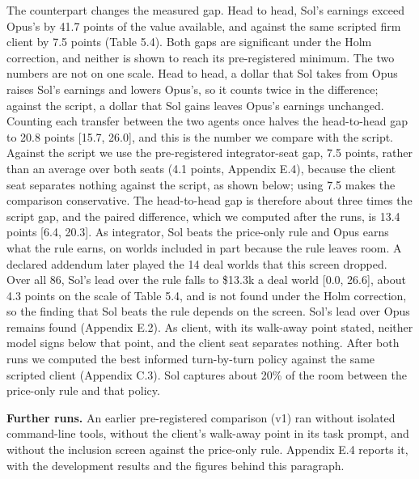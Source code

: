 The counterpart changes the measured gap. Head to head, Sol's earnings exceed Opus's by 41.7 points of the value
available, and against the same scripted firm client by 7.5 points (Table 5.4). Both gaps are significant under the
Holm correction, and neither is shown to reach its pre-registered minimum. The two numbers are not on one scale. Head
to head, a dollar that Sol takes from Opus raises Sol's earnings and lowers Opus's, so it counts twice in the
difference; against the script, a dollar that Sol gains leaves Opus's earnings unchanged. Counting each transfer between the two agents once halves the head-to-head gap to 20.8 points {[}15.7, 26.0{]}, and
this is the number we compare with the script. Against the script we use the pre-registered integrator-seat gap,
7.5 points, rather than an average over both seats (4.1 points, Appendix E.4), because the client seat separates
nothing against the script, as shown below; using 7.5 makes the comparison conservative. The head-to-head gap is
therefore about three times the script gap, and the paired difference, which we computed after the runs, is 13.4
points {[}6.4, 20.3{]}. As
integrator, Sol beats the price-only rule and Opus earns what the rule earns, on worlds included in part because the rule
leaves room. A declared addendum later played the 14 deal worlds that this screen dropped. Over all 86, Sol's lead over
the rule falls to \$13.3k a deal world {[}0.0, 26.6{]}, about 4.3 points on the scale of Table 5.4, and is not found under
the Holm correction, so the finding that Sol beats the rule depends on the screen. Sol's lead over Opus remains found
(Appendix E.2). As client, with its walk-away point
stated, neither model signs below that point, and the client seat separates nothing. After both runs we computed the
best informed turn-by-turn policy against the same scripted client (Appendix C.3). Sol captures about 20\% of the room
between the price-only rule and that policy.

\textbf{Further runs.} An earlier pre-registered comparison (v1) ran without isolated command-line tools, without the
client's walk-away point in its task prompt, and without the inclusion screen against the price-only rule. Appendix
E.4 reports it, with the development results and the figures behind this paragraph.

